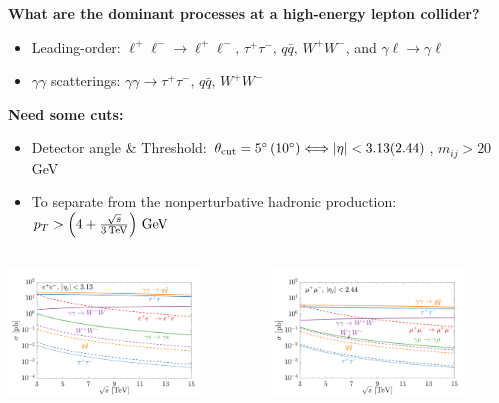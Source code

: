 \documentclass[aspectratio=169]{beamer}
\begin{document}
\begin{frame}
	\textcolor{PittRoyal}{\bf What are the dominant processes at a high-energy lepton collider? }
	\begin{itemize}
		\item Leading-order: $\ell^+\ell^- \to \ell^+\ell^-,\,\tau^+\tau^-,\,q{\bar q},\, W^+W^-$, and $\gamma \ell \to \gamma \ell$
		\item $\gamma \gamma$ scatterings: $\gamma\gamma \to \tau^+\tau^-,\,q{\bar q},\, W^+W^-$
	\end{itemize}
	\textcolor{PittRoyal}{\bf Need some cuts: }
	\begin{itemize}
		\item Detector angle \& Threshold: $\theta_{\rm cut}=5^\circ\,(10^\circ)\Longleftrightarrow |\eta|<3.13 (2.44)$, $m_{ij}>20$ GeV
		\item To separate from the nonperturbative hadronic production: $p_T>\left(4+\frac{\sqrt s}{3 \,{\rm TeV}}\right)\,{\rm GeV}$\\
	\end{itemize}
	\begin{columns}
	\begin{column}{0.5\textwidth}
	\hspace{10mm}\includegraphics[width=0.8\textwidth]{figs/sigma_eeCollider_c5_3pt_s20}
	\end{column}
	\begin{column}{0.5\textwidth}
		\includegraphics[width=0.8\textwidth]{figs/sigma_mmCollider_c10_3pt_s20}

\end{column}
\end{columns}
\end{frame}
\end{document}
